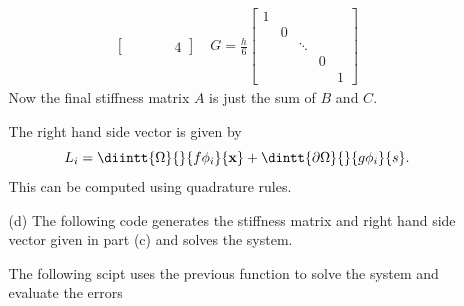 \documentclass[11pt, titlepage]{article}
\begin{document}
\begin{enumerate}
\begin{enumerate}
\begin{align*}
\begin{bmatrix}
              &   &        &   & 4
          \end{bmatrix} \quad
          G =
          \frac{h}{6}
          \begin{bmatrix}
            1 &   &        &   & \\
              & 0 &        &   & \\
              &   & \ddots &   & \\
              &   &        & 0 & \\
              &   &        &   & 1
          \end{bmatrix}
        \end{align*}
        Now the final stiffness matrix $A$ is just the sum of $B$ and $C$.

        The right hand side vector is given by
        \[
          L_i = \diintt{\Omega}{}{f \phi_i}{\v{x}} + \dintt{\partial \Omega}{}{g\phi_i}{s}.
        \]
        This can be computed using quadrature rules.

      \item[(d)]
        The following code generates the stiffness matrix and right hand side
        vector given in part (c) and solves the system.

        

        The following scipt uses the previous function to solve the system and
        evaluate the errors
        


\end{enumerate}
\end{enumerate}
\end{document}
